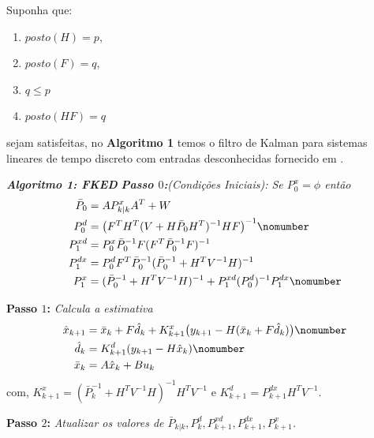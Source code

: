 \begin{frame}
	Suponha que:
	\begin{enumerate}
		\item $posto(H)=p$,
		\item $posto(F)=q$,
		\item $q\leq p$
		\item $posto(HF) = q$
	\end{enumerate}
	sejam satisfeitas, no \textbf{Algoritmo 1} temos o filtro de Kalman para sistemas lineares de tempo discreto com entradas desconhecidas fornecido em \cite{Darouach1995}.
\end{frame}

\begin{frame}
	\hline
	\vspace{0.1cm}
	\emph{\small \textbf{Algoritmo 1: FKED}}
	\vspace{0.1cm}
	\hline
	\vspace{0.1cm}
	\small \textit{\textbf{Passo $0$:}(Condições Iniciais): Se $P^{x}_{0} =  \phi$ então}
	\small 
	\begin{align}
		\bar{P}_{0} &= AP^{x}_{k|k}A^{T} + W \nonumber \\
		P^{d}_{0} &= \big(F^{T} H^{T} (V + H\bar{P}_{0} H^{T})^{-1} HF\big)^{-1} \label{eqPd} \nomumber \\
		P^{xd}_{1} &= P^{x}_{0} \bar{P}^{-1}_{0} F (F^{T} \bar{P}^{-1}_{0} F)^{-1} \nonumber \\
		P^{dx}_{1} &= P^{d}_{0} F^{T} \bar{P}^{-1}_{0} (\bar{P}^{-1}_{0} + H^{T} V^{-1} H)^{-1} \nonumber \\
		P^{x}_{1} &= (\bar{P}^{-1}_{0} + H^{T} V^{-1} H )^{-1} + P^{xd}_{1} (P^{d}_{0})^{-1} P^{dx}_{1}\label{eqPx} \nomumber
	\end{align}
	
	\small \textbf{Passo $1$:} \textit{Calcula a estimativa}
	\small
	\begin{align}
		\hat{x}_{k+1} &= \bar{x}_{k} + F\hat{d}_{k} + K_{k+1}^{x}\big(y_{k+1} - H(\bar{x}_{k} + F\hat{d}_{k})\big) \label{eqXhat}\nomumber \\
		\hat{d}_{k} &= K_{k+1}^{d}(y_{k+1} - H\hat{x}_{k}) \label{eqDhat}\nomumber \\
		\bar{x}_{k} &= A\hat{x}_{k} + Bu_{k} \nonumber
	\end{align}
	\small com, $K_{k+1}^{x} = (\bar{P}_{k}^{-1} + H^{T}V^{-1}H)^{-1}H^{T}V^{-1}$ e $K_{k+1}^{d} = P_{k+1}^{dx}H^{T}V^{-1}$.
	
	\vspace{0.2cm}
	\textbf{Passo $2$:} \textit{Atualizar os valores de $\bar{P}_{k|k}, P^{d}_{k}, P^{xd}_{k+1}, P^{dx}_{k+1}, P^{x}_{k+1}$.}
	\hline
\end{frame}

